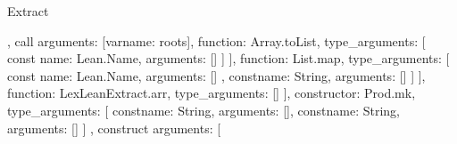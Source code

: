 \begin{lexlean}{Extract}
\begin{toolingmodule}
{{{{{{{{{{{{{{{{{{{{{{                                                                    }
                                                                  },
                                                                  call{
                                                                    arguments: [var{name: roots}],
                                                                    function: Array.toList,
                                                                    type_arguments: [
                                                                      const{
                                                                        name: Lean.Name,
                                                                        arguments: []
                                                                      }
                                                                    ]
                                                                  }
                                                                ],
                                                                function: List.map,
                                                                type_arguments: [
                                                                  const{
                                                                    name: Lean.Name,
                                                                    arguments: []
                                                                  },
                                                                  const{name: String, arguments: []}
                                                                ]
                                                              }
                                                            ],
                                                            function: LexLeanExtract.arr,
                                                            type_arguments: []
                                                          }
                                                        ],
                                                        constructor: Prod.mk,
                                                        type_arguments: [
                                                          const{name: String, arguments: []},
                                                          const{name: String, arguments: []}
                                                        ]
                                                      },
                                                      construct{
                                                        arguments: [
}}}}}}}}}}}}}}}}}}
\end{toolingmodule}
\end{lexlean}
